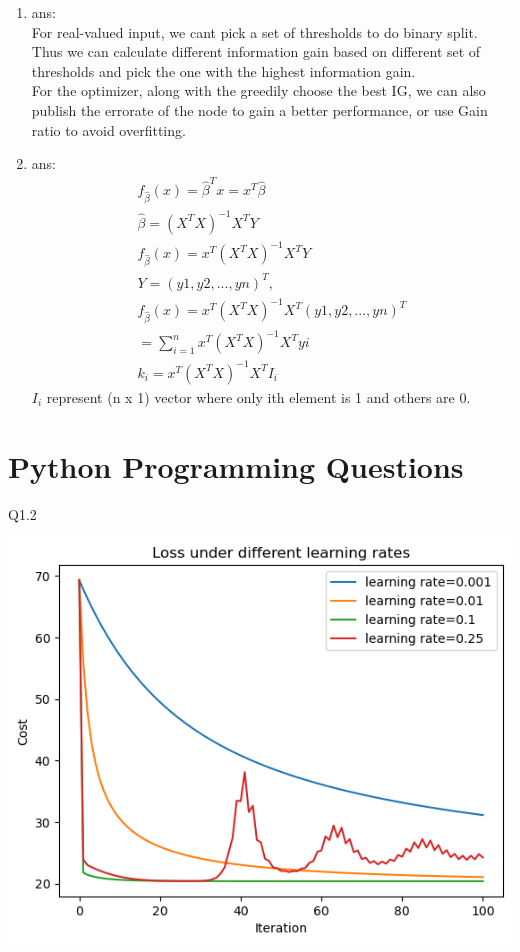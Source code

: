 \documentclass[12pt]{article}
\begin{document}
\begin{enumerate}
\item ans:\\
  For real-valued input, we cant pick a set of thresholds to do binary split. Thus we can calculate different information gain 
  based on different set of thresholds and pick the one with the highest information gain.\\
  For the optimizer, along with the greedily choose the best IG, we can also publish the errorate of the node to gain a better performance, or use Gain ratio to avoid overfitting.\\
\item ans:\\
\begin{gather*} 
  f_{\hat{\beta}}(x) = \hat{\beta}^T x  = x ^ T \hat{\beta} \\
  \hat{\beta} = (X^T X)^{-1} X^T Y \\
  f_{\hat{\beta}}(x) = x^T (X^T X)^{-1} X^T Y \\
  Y = (y1, y2, ..., yn)^T,  \\
  f_{\hat{\beta}}(x) = x^T (X^T X)^{-1} X^T (y1, y2, ..., yn)^T \\
  = \sum_{i=1}^n x^T (X^T X)^{-1} X^T yi \\
  k_i = x^T (X^T X)^{-1} X^T I_i
\end{gather*}
$I_i$ represent (n x 1) vector where only ith element is 1 and others are 0.
 
\end{enumerate}

\section{Python Programming Questions}

Q1.2

\includegraphics{1.2.png}
\end{document}
